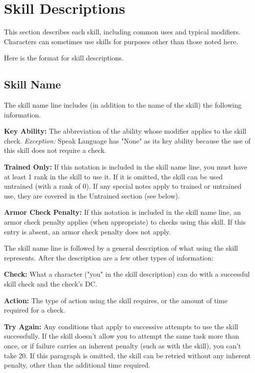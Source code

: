 \section{Skill Descriptions}

This section describes each skill, including common uses and typical modifiers. Characters can sometimes use skills for purposes other than those noted here.

Here is the format for skill descriptions.

\subsection{Skill Name}

The skill name line includes (in addition to the name of the skill) the following information.

\textbf{Key Ability:} The abbreviation of the ability whose modifier applies to the skill check. \textit{Exception:} Speak Language has "None" as its key ability because the use of this skill does not require a check.

\textbf{Trained Only:} If this notation is included in the skill name line, you must have at least 1 rank in the skill to use it. If it is omitted, the skill can be used untrained (with a rank of 0). If any special notes apply to trained or untrained use, they are covered in the Untrained section (see below).

\textbf{Armor Check Penalty:} If this notation is included in the skill name line, an armor check penalty applies (when appropriate) to checks using this skill. If this entry is absent, an armor check penalty does not apply.

\vspace{12pt}
The skill name line is followed by a general description of what using the skill represents. After the description are a few other types of information:

\textbf{Check:} What a character ("you" in the skill description) can do with a successful skill check and the check's DC.

\textbf{Action:} The type of action using the skill requires, or the amount of time required for a check.

\textbf{Try Again:} Any conditions that apply to successive attempts to use the skill successfully. If the skill doesn't allow you to attempt the same task more than once, or if failure carries an inherent penalty (such as with the  skill), you can't take 20. If this paragraph is omitted, the skill can be retried without any inherent penalty, other than the additional time required.


